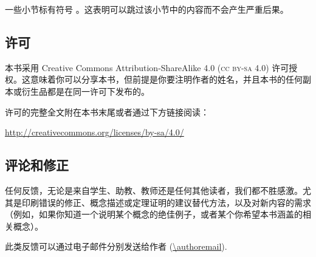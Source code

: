 一些小节标有符号 \optmarksymbol{}。这表明可以跳过该小节中的内容而不会产生严重后果。

\subsection*{许可}

本书采用 Creative Commons Attribution-ShareAlike 4.0 (\textsc{cc by-sa 4.0}) 许可授权。这意味着你可以分享本书，但前提是你要注明作者的姓名，并且本书的任何副本或衍生品都是在同一许可下发布的。

许可的完整全文附在本书末尾或者通过下方链接阅读：

\begin{center}
\url{http://creativecommons.org/licenses/by-sa/4.0/}
\end{center}

\subsection*{评论和修正}

任何反馈，无论是来自学生、助教、教师还是任何其他读者，我们都不胜感激。尤其是印刷错误的修正、概念描述或定理证明的建议替代方法，以及对新内容的需求（例如，如果你知道一个说明某个概念的绝佳例子，或者某个你希望本书涵盖的相关概念）。

此类反馈可以通过电子邮件分别发送给作者 (\url{\authoremail}).